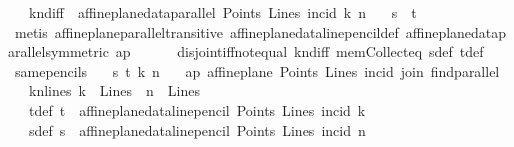 \begin{isabellebody}
\ \ \ kn{\isacharunderscore}{\kern0pt}diff{\isacharcolon}{\kern0pt}\ {\isachardoublequoteopen}{\isasymnot}\ affine{\isacharunderscore}{\kern0pt}plane{\isacharunderscore}{\kern0pt}data{\isachardot}{\kern0pt}parallel\ Points\ Lines\ {\isacharparenleft}{\kern0pt}incid{\isacharparenright}{\kern0pt}\ k\ n{\isachardoublequoteclose}\isanewline
\ \ \ {\isachardoublequoteopen}s\ {\isasyminter}\ t\ {\isacharequal}{\kern0pt}\ {\isacharbraceleft}{\kern0pt}{\isacharbraceright}{\kern0pt}{\isachardoublequoteclose}\isanewline
%
\isadelimproof
\ \ %
\endisadelimproof
%
\isatagproof
{}\isamarkupfalse%
\ {\isacharparenleft}{\kern0pt}metis\ affine{\isacharunderscore}{\kern0pt}plane{\isachardot}{\kern0pt}parallel{\isacharunderscore}{\kern0pt}transitive{}\ affine{\isacharunderscore}{\kern0pt}plane{\isacharunderscore}{\kern0pt}data{\isachardot}{\kern0pt}line{\isacharunderscore}{\kern0pt}pencil{\isacharunderscore}{\kern0pt}def\ affine{\isacharunderscore}{\kern0pt}plane{\isacharunderscore}{\kern0pt}data{\isachardot}{\kern0pt}parallel{\isacharunderscore}{\kern0pt}symmetric\ ap\isanewline
\ \ \ \ \ \ disjoint{\isacharunderscore}{\kern0pt}iff{\isacharunderscore}{\kern0pt}not{\isacharunderscore}{\kern0pt}equal\ kn{\isacharunderscore}{\kern0pt}diff\ mem{\isacharunderscore}{\kern0pt}Collect{\isacharunderscore}{\kern0pt}eq\ sdef\ tdef{\isacharparenright}{\kern0pt}%
\endisatagproof
{\isafoldproof}%
%
\isadelimproof
\isanewline
%
\endisadelimproof
\isanewline
{}\isamarkupfalse%
\ same{\isacharunderscore}{\kern0pt}pencils{\isacharcolon}{\kern0pt}\isanewline
\ \ \ s\ t\ k\ n\isanewline
\ \ \ ap{\isacharcolon}{\kern0pt}\ {\isachardoublequoteopen}affine{\isacharunderscore}{\kern0pt}plane\ Points\ Lines\ incid\ join\ find{\isacharunderscore}{\kern0pt}parallel{\isachardoublequoteclose}\isanewline
\ \ \ knlines{\isacharcolon}{\kern0pt}\ {\isachardoublequoteopen}k\ {\isasymin}\ Lines\ {\isasymand}\ n\ {\isasymin}\ Lines{\isachardoublequoteclose}\isanewline
\ \ \ tdef{\isacharcolon}{\kern0pt}\ {\isachardoublequoteopen}t\ {\isacharequal}{\kern0pt}\ affine{\isacharunderscore}{\kern0pt}plane{\isacharunderscore}{\kern0pt}data{\isachardot}{\kern0pt}line{\isacharunderscore}{\kern0pt}pencil\ Points\ Lines\ {\isacharparenleft}{\kern0pt}incid{\isacharparenright}{\kern0pt}\ k{\isachardoublequoteclose}\isanewline
\ \ \ sdef{\isacharcolon}{\kern0pt}\ {\isachardoublequoteopen}s\ {\isacharequal}{\kern0pt}\ affine{\isacharunderscore}{\kern0pt}plane{\isacharunderscore}{\kern0pt}data{\isachardot}{\kern0pt}line{\isacharunderscore}{\kern0pt}pencil\ Points\ Lines\ {\isacharparenleft}{\kern0pt}incid{\isacharparenright}{\kern0pt}\ n{\isachardoublequoteclose}\isanewline

\end{isabellebody}
